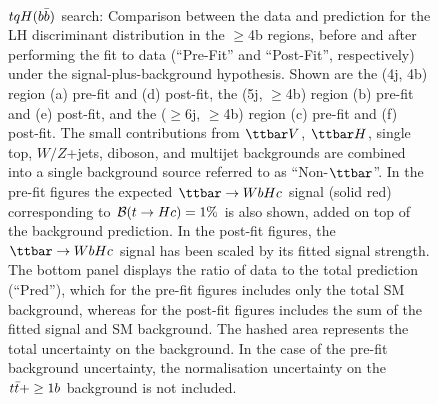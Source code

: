 \begin{figure}[htbp]
\begin{center}
 \\
\caption{\small{$tqH(b\bar{b})$ search: Comparison between the data and prediction for the LH discriminant distribution in the $\geq$4b regions,
before and after performing the fit to data  (``Pre-Fit'' and ``Post-Fit'', respectively) under the signal-plus-background hypothesis.
Shown are the (4j, 4b) region (a) pre-fit and (d) post-fit,  the (5j, $\geq$4b) region (b) pre-fit and (e) post-fit, and
the ($\geq$6j, $\geq$4b) region (c) pre-fit and (f) post-fit.
The small contributions from $\ttbar V$, $\ttbar H$, single top, $W/Z$+jets, diboson, and multijet backgrounds are combined into a single background source 
referred to as ``Non-$\ttbar$''. 
In the pre-fit figures the expected $\Hc$ signal (solid red) corresponding to $\mathcal{B}(t\to Hc)=1\%$ is also shown,
added on top of the background prediction. In the post-fit figures, the $\Hc$ signal has been scaled by its fitted signal strength.
The bottom panel displays the ratio of data to the total prediction (``Pred''), which for the pre-fit figures includes only the total SM background,
whereas for the post-fit figures includes the sum of the fitted signal and SM background.
The hashed area represents the total uncertainty on the background.
In the case of the pre-fit background uncertainty, the normalisation uncertainty on the $t\bar{t}+\geq1b$ background is not included. }}
\label{fig:prepostfit_unblinded_WbHc_4btagin}
\end{center}
\end{figure}


